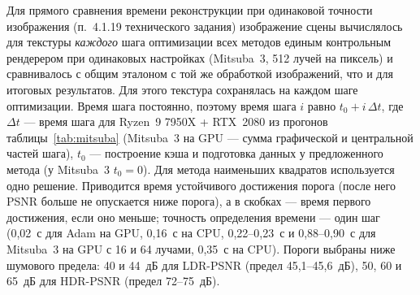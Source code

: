 Для прямого сравнения времени реконструкции при одинаковой точности изображения (п.~4.1.19 технического задания) изображение сцены вычислялось для текстуры \emph{каждого} шага оптимизации всех методов единым контрольным рендерером при одинаковых настройках (Mitsuba~3, 512 лучей на пиксель) и сравнивалось с общим эталоном с той же обработкой изображений, что и для итоговых результатов. Для этого текстура сохранялась на каждом шаге оптимизации. Время шага постоянно, поэтому время шага $i$ равно $t_0+i\,\Delta t$, где $\Delta t$ --- время шага для Ryzen~9 7950X + RTX~2080 из прогонов таблицы~\ref{tab:mitsuba} (Mitsuba~3 на GPU --- сумма графической и центральной частей шага), $t_0$ --- построение кэша и подготовка данных у предложенного метода (у Mitsuba~3 $t_0=0$). Для метода наименьших квадратов используется одно решение. Приводится время устойчивого достижения порога (после него PSNR больше не опускается ниже порога), а в скобках --- время первого достижения, если оно меньше; точность определения времени --- один шаг (0,02~с для Adam на GPU, 0,16~с на CPU, 0,22--0,23~с и 0,88--0,90~с для Mitsuba~3 на GPU с 16 и 64 лучами, 0,35~с на CPU). Пороги выбраны ниже шумового предела: 40 и 44~дБ для LDR-PSNR (предел 45,1--45,6~дБ), 50, 60 и 65~дБ для HDR-PSNR (предел 72--75~дБ).

